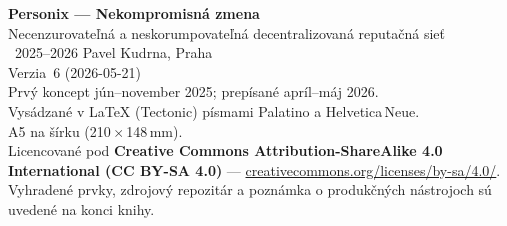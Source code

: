 \thispagestyle{empty}
\ifdefined\printmode\vspace*{\fill}\else{}\fi
\begin{flushleft}\small\sffamily
\textbf{Personix --- Nekompromisná zmena}\\[0.3em]
Necenzurovateľná a neskorumpovateľná decentralizovaná reputačná sieť\\[1.4em]

\textcopyright\ 2025--2026 Pavel Kudrna, Praha\\[0.4em]

Verzia~6 (2026-05-21)\\
Prvý koncept jún--november 2025; prepísané apríl--máj 2026.\\[1.4em]

Vysádzané v \LaTeX{} (Tectonic) písmami Palatino a Helvetica\,Neue.\\
A5 na šírku (210\,$\times$\,148\,mm).\\[1.4em]

Licencované pod \textbf{Creative Commons Attribution-ShareAlike 4.0
International (CC BY-SA 4.0)} ---
\href{https://creativecommons.org/licenses/by-sa/4.0/}{creativecommons.org/licenses/by-sa/4.0/}.
Vyhradené prvky, zdrojový repozitár a poznámka o produkčných nástrojoch
sú uvedené na konci knihy.
\end{flushleft}
\ifdefined\printmode\else{}\fi
\clearpage
